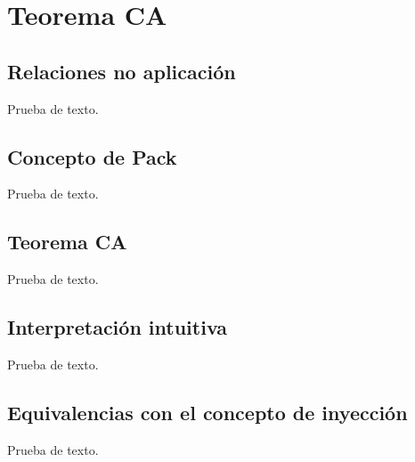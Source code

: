 \chapter{Teorema CA}

\newpage
\section{Relaciones no aplicación}
Prueba de texto.

\newpage
\section{Concepto de Pack}
Prueba de texto.

\newpage
\section{Teorema CA}
Prueba de texto.

\newpage
\section{Interpretación intuitiva}
Prueba de texto.

\newpage
\section{Equivalencias con el concepto de inyección}
Prueba de texto.